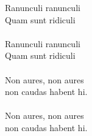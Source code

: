 \vspace{10pt}
Ranunculi ranunculi\\
Quam sunt ridiculi\\
\\
Ranunculi ranunculi\\
Quam sunt ridiculi\\
\\
Non aures, non aures\\
non caudas habent hi.\\
\\
Non aures, non aures\\
non caudas habent hi.
